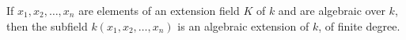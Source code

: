 If $x_1, x_2, \ldots, x_n$ are elements of an extension field $K$ of $k$ and are algebraic over $k$, then the subfield $k(x_1, x_2, \ldots, x_n)$ is an algebraic extension of $k$, of finite degree.
